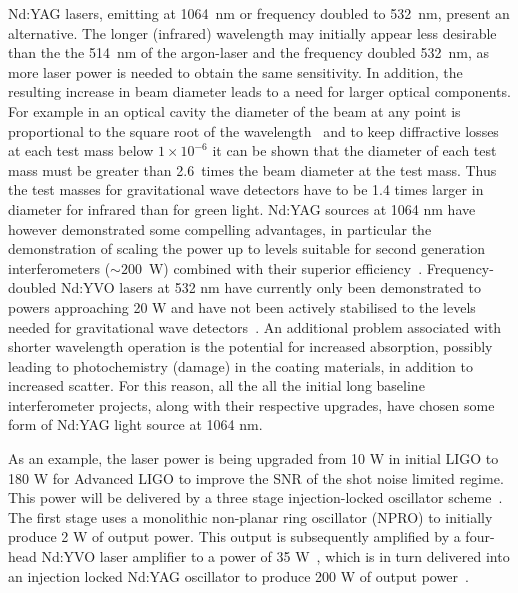 \documentclass{article}
\begin{document}
Nd:YAG lasers, emitting at 1064~nm or frequency doubled to 532~nm, present an
alternative. The longer (infrared) wavelength may initially appear less
desirable than the the 514~nm of the argon-laser and the frequency doubled
532~nm, as more laser power is needed to obtain the same sensitivity.  In
addition, the resulting increase in beam diameter leads to a need for larger
optical components. For example in an optical cavity the diameter of the beam at
any point is proportional to the square root of the wavelength~\cite{Kogelnik}
and to keep diffractive losses at each test mass below $1 \times 10^{-6}$ it can
be shown that the diameter of each test mass must be greater than 2.6~times the
beam diameter at the test mass. Thus the test masses for gravitational wave
detectors have to be 1.4 times larger in diameter for infrared than for green
light. Nd:YAG sources at 1064 nm have however demonstrated some compelling
advantages, in particular the demonstration of scaling the power up to levels
suitable for second generation interferometers ($\sim200$~W) combined with their
superior efficiency~\cite{Shine,Vogt,Kerr}. Frequency-doubled Nd:YVO lasers at
532 nm have currently only been demonstrated to powers approaching 20 W and have
not been actively stabilised to the levels needed for gravitational wave
detectors~\cite{Mavalvala:2010}. An additional problem associated with shorter
wavelength operation is the potential for increased absorption, possibly leading
to photochemistry (damage) in the coating materials, in addition to increased
scatter. For this reason, all the all the initial long baseline interferometer
projects, along with their respective upgrades, have chosen some form of Nd:YAG
light source at 1064 nm.

As an example, the laser power is being upgraded from 10 W in initial LIGO to
180 W for Advanced LIGO to improve the SNR of the shot noise limited regime.
This power will be delivered by a three stage injection-locked oscillator
scheme~\cite{Cregut, Nabors, Golla, Frede:2005}.  The first stage uses a
monolithic non-planar ring oscillator (NPRO) to initially produce 2 W of output
power.  This output is subsequently amplified by a four-head Nd:YVO laser
amplifier to a power of 35 W~\cite{Frede:2007}, which is in turn delivered into
an injection locked Nd:YAG oscillator to produce 200 W of output
power~\cite{Wilke:2008}.
\end{document}
